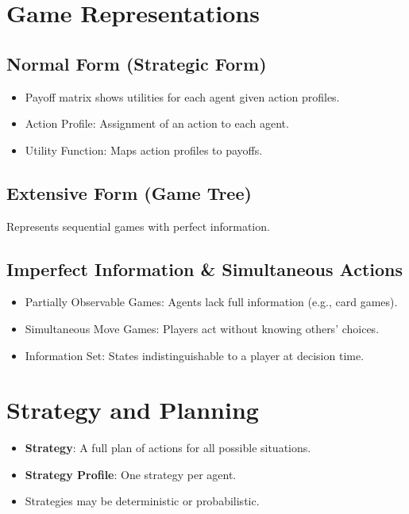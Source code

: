 \section{Game Representations}

\subsection{Normal Form (Strategic Form)}
\begin{itemize}
    \item Payoff matrix shows utilities for each agent given action profiles.
    \item Action Profile: Assignment of an action to each agent.
    \item Utility Function: Maps action profiles to payoffs.
\end{itemize}

\subsection{Extensive Form (Game Tree)}
Represents sequential games with perfect information.

\subsection{Imperfect Information \& Simultaneous Actions}
\begin{itemize}
    \item Partially Observable Games: Agents lack full information (e.g., card games).
    \item Simultaneous Move Games: Players act without knowing others’ choices.
    \item Information Set: States indistinguishable to a player at decision time.
\end{itemize}

\section{Strategy and Planning}
\begin{itemize}
    \item \textbf{Strategy}: A full plan of actions for all possible situations.
    \item \textbf{Strategy Profile}: One strategy per agent.
    \item Strategies may be deterministic or probabilistic.
\end{itemize}

